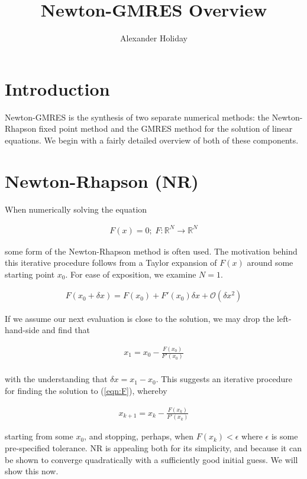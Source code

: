 \documentclass[11pt]{article}
\begin{document}
\title{\vspace{-10mm}Newton-GMRES Overview}
\author{Alexander Holiday}
\maketitle

\section*{Introduction}
Newton-GMRES is the synthesis of two separate numerical methods: the Newton-Rhapson fixed point method and the GMRES method for the solution of linear equations. We begin with a fairly detailed overview of both of these components.

\section{Newton-Rhapson (NR)}

When numerically solving the equation

\begin{align}
\label{eqn:F}
F(x) = 0 ; \; F: \mathbb{R}^N \rightarrow \mathbb{R}^N
\end{align}

some form of the Newton-Rhapson method is often used. The motivation behind this iterative procedure follows from a Taylor expansion of $F(x)$ around some starting point $x_0$. For ease of exposition, we examine $N=1$.

\begin{align*}
F(x_0 + \delta x) = F(x_0) + F'(x_0) \delta x + \mathcal{O}(\delta x^2)
\end{align*}

If we assume our next evaluation is close to the solution, we may drop the left-hand-side and find that

\begin{align*}
x_1 = x_0 - \frac{F(x_0)}{F'(x_0)} \\
\end{align*}

with the understanding that $\delta x = x_1 - x_0$. This suggests an iterative procedure for finding the solution to (\ref{eqn:F}), whereby 

\begin{align}
\label{eqn:NRstep}
x_{k+1} = x_k - \frac{F(x_k)}{F'(x_k)}
\end{align}

starting from some $x_0$, and stopping, perhaps, when $F(x_k) < \epsilon$ where $\epsilon$ is some pre-specified tolerance. NR is appealing both for its simplicity, and because it can be shown to converge quadratically with a sufficiently good initial guess. We will show this now.
\end{document}
